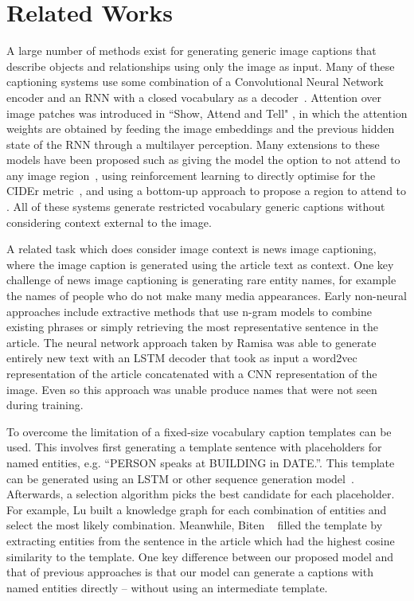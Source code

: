 
\section{Related Works}

A large number of methods exist for generating generic image captions that
describe objects and relationships using only the image as input. Many of these
captioning systems use some combination of a Convolutional Neural Network
encoder and an RNN with a closed
vocabulary as a decoder~\cite{Karpathy2015DeepVA, Donahue2015LongTR,
Vinyals2015ShowAT}.
Attention over image patches was introduced in ``Show, Attend and Tell"
\cite{Xu2015ShowAA}, in which the attention weights are obtained by feeding the
image embeddings and the previous hidden state of the RNN through a multilayer
perception. Many extensions to these models have been proposed such as giving
the model the option to not
attend to any image region~\cite{Lu2017KnowingWT}, using reinforcement learning
to directly optimise for the CIDEr metric~\cite{Rennie2017SelfCriticalST,
Gao2019DeliberateAN}, and using a bottom-up approach to propose a region to
attend to \cite{Anderson2017BottomUpAT}. All of these systems generate
restricted vocabulary generic captions without considering context external to
the image.

A related task which does consider image context is news image captioning,
where the image caption is generated using the article text as context.
One key challenge of news image captioning is generating rare entity names, for
example the names of people who do not make many media appearances. Early
non-neural approaches include
extractive methods that use n-gram models to combine existing phrases
\cite{Feng2013AutomaticCG} or simply retrieving the most representative
sentence \cite{Tariq2017ACE} in the article. The neural network approach taken
by Ramisa \etal
\cite{Ramisa2016BreakingNewsAA} was able to generate entirely new text with an
LSTM decoder that took as input a word2vec representation of the
article concatenated with a CNN representation of the image. Even so this
approach was unable produce names that were not seen during training.

To overcome the limitation of a fixed-size vocabulary caption templates can be
used. This involves first generating a
template sentence with placeholders for named entities, e.g. ``PERSON speaks at
BUILDING in
DATE.''. This template can be generated using an LSTM or other sequence
generation model~\cite{Biten2019GoodNews}. Afterwards, a selection algorithm
picks the best candidate
for each placeholder. For example, Lu \etal \cite{Lu2018EntityAI} built a
knowledge graph
for each combination of entities and select the most likely combination.
Meanwhile, Biten \etal~\cite{Biten2019GoodNews} filled the template by
extracting entities from the sentence in the article which had the highest
cosine similarity to
the template. One key difference between our proposed model and that of
previous approaches\cite{Biten2019GoodNews,Lu2018EntityAI} is that our model can
generate a captions with named entities directly -- without using an
intermediate template.

